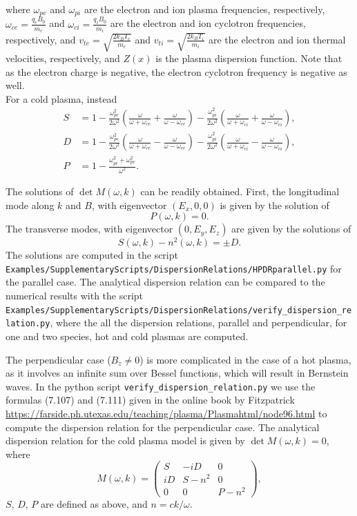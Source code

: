 \documentclass[11pt]{article}
\begin{document}
where $\omega_{pe}$ and $\omega_{pi}$ are the electron and ion plasma frequencies, respectively, $\omega_{ce}=\frac{q_eB_0}{m_e}$ and $\omega_{ci}=\frac{q_iB_0}{m_i}$ are the electron and ion cyclotron frequencies, respectively, and $v_{te} = \sqrt{\frac{2 k_B T_e}{m_e}}$ and $v_{ti} = \sqrt{\frac{2 k_B T_i}{m_i}}$ are the electron and ion thermal velocities, respectively, and $Z(x)$ is the plasma dispersion function. Note that as the electron charge is negative, the electron cyclotron frequency is negative as well.\\
For a cold plasma, instead
\begin{align}
    S &= 1 - \frac{\omega_{pe}^2}{2\omega^2} \left( \frac{\omega}{\omega+\omega_{ce}}
    +\frac{\omega}{\omega-\omega_{ce}}\right)
    - \frac{\omega_{pi}^2}{2\omega^2} \left( \frac{\omega}{\omega+\omega_{ci}}
    +\frac{\omega}{\omega-\omega_{ci}}\right), \\ 
    D &= 1 - \frac{\omega_{pe}^2}{2\omega^2} \left( \frac{\omega}{\omega+\omega_{ce}}
    -\frac{\omega}{\omega-\omega_{ce}}\right)
    - \frac{\omega_{pi}^2}{2\omega^2} \left( \frac{\omega}{\omega+\omega_{ci}}
    -\frac{\omega}{\omega-\omega_{ci}}\right), \\ 
    P &= 1 - \frac{\omega_{pi}^2 + \omega_{pe}^2}{\omega^2} .
\end{align}


The solutions of $\det M(\omega,k)$ can be readily obtained.
First, the longitudinal mode along $k$ and $B$, with eigenvector $(E_x,0,0)$ is given by the solution of
$$ P(\omega,k) = 0.$$
The transverse modes, with eigenvector $(0,E_y,E_z)$ are given by the solutions of
$$ S(\omega,k) - n^2(\omega,k) = \pm D.$$
The solutions are computed in the script \verb|Examples/SupplementaryScripts/DispersionRelations/HPDRparallel.py| for the parallel case. The analytical dispersion relation can be compared to the numerical results with the script \verb|Examples/SupplementaryScripts/DispersionRelations/verify_dispersion_relation.py|, where the all the dispersion relations, parallel and perpendicular, for one and two species, hot and cold plasmas are computed.

The perpendicular case ($B_z\neq0$) is more complicated in the case of a hot plasma, as it involves an infinite sum over Bessel functions, which will result in Bernstein waves.
In the python script \verb|verify_dispersion_relation.py| we use the formulas (7.107) and (7.111) given in the online book by Fitzpatrick \url{https://farside.ph.utexas.edu/teaching/plasma/Plasmahtml/node96.html} to compute the dispersion relation for the perpendicular case. The analytical dispersion relation for the cold plasma model is given by $\det M(\omega,k) = 0$, where
$$ M(\omega, k) = 
\begin{pmatrix}
    S & -iD & 0\\
    iD & S-n^2 & 0\\
    0 & 0 & P-n^2
\end{pmatrix},$$
$S$, $D$, $P$ are defined as above, and $n = ck/\omega$.
\end{document}
